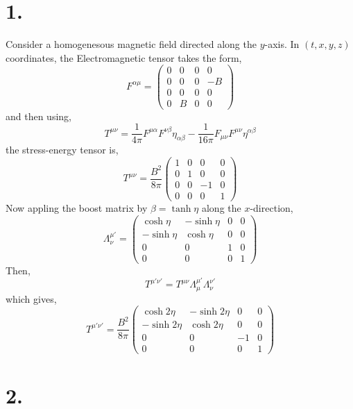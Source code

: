 \documentclass[12pt]{article}
\begin{document}

\section*{1. }

Consider a homogenesous magnetic field directed along the $y$-axis. In $(t,x,y,z)$ coordinates, the Electromagnetic tensor takes the form,
\[ 
F^{\alpha \mu} = \begin{pmatrix}
0 & 0 & 0 & 0
\\
0 & 0 & 0 & -B
\\
0 & 0 & 0 & 0
\\
0 & B & 0 & 0
\end{pmatrix} 
\]
and then using,
\[ T^{\mu \nu} = \frac{1}{4 \pi} F^{\mu \alpha} F^{\nu \beta} \eta_{\alpha \beta} - \frac{1}{16 \pi} F_{\mu \nu} F^{\mu \nu} \eta^{\alpha \beta} \] 
the stress-energy tensor is,
\[ T^{\mu \nu} = \frac{B^2}{8 \pi}
\begin{pmatrix}
1 & 0 & 0 & 0
\\
0 & 1 & 0 & 0
\\
0 & 0 & -1 & 0
\\
0 & 0 & 0 & 1
\end{pmatrix} \]
Now appling the boost matrix by $\beta = \tanh{\eta}$ along the $x$-direction,
\[ \Lambda^{\mu'}_{\nu} = 
\begin{pmatrix}
\cosh{\eta} & - \sinh{\eta} & 0 & 0 
\\
- \sinh{\eta} & \cosh{\eta} & 0 & 0
\\
0 & 0 & 1 & 0 
\\
0 & 0 & 0 & 1
\end{pmatrix} \]
Then,
\[ T^{\mu' \nu'} = T^{\mu \nu} \Lambda^{\mu'}_{\mu} \Lambda^{\nu'}_{\nu} \]
which gives,
\[ T^{\mu' \nu'} = \frac{B^2}{8 \pi}
\begin{pmatrix}
\cosh{2 \eta} & - \sinh{2 \eta} & 0 & 0
\\
- \sinh{2 \eta} & \cosh{2 \eta} & 0 & 0
\\
0 & 0 & -1 & 0
\\
0 & 0 & 0 & 1
\end{pmatrix} \]

\section*{2. }
\end{document}
